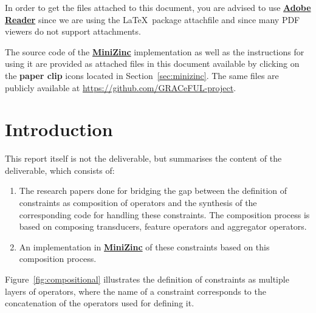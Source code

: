 \documentclass{article}
\begin{document}
In order to get the files attached to this document,
you are advised to use \href{https://get.adobe.com/fr/reader/}{\bf \textsf{Adobe Reader}} since
we are using the \LaTeX\ package \textsf{attachfile}
and since many PDF viewers do not support
attachments.

The source code of the \href{http://www.minizinc.org/}{\bf MiniZinc}
implementation as well as the instructions for using it are provided
as attached files
in this document available by clicking on the {\bf paper clip} icons
located in Section~\ref{sec:minizinc}. The same files are publicly available at 
\url{https://github.com/GRACeFUL-project}.

\section{Introduction}

This report itself is not the deliverable,
but summarises the content of the deliverable,
which consists of:
\begin{enumerate}
\item
The research papers done for bridging the gap
between the definition of constraints as composition of operators and
the synthesis of the corresponding code for handling these constraints.
The composition process is based on composing transducers, feature operators
and aggregator operators.
\item
An implementation in \href{http://www.minizinc.org/}{\bf MiniZinc}
of these constraints based on this composition process.
\end{enumerate}
Figure~\ref{fig:compositional} illustrates the definition of constraints
as multiple layers of operators, where the name of a constraint corresponds
to the concatenation of the operators used for defining it.
\end{document}
